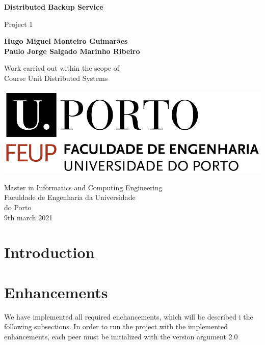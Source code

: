 \documentclass[11pt]{article}
\begin{document}
\begin{titlepage}
	\begin{center}
		\vspace*{1cm}
		
		\Large
		\textbf{Distributed Backup Service}
		
		\vspace{0.5cm}
		\large
		Project 1 
		
		\vspace{1.5cm}
		
		\textbf{Hugo Miguel Monteiro Guimarães}\\
		\textbf{Paulo Jorge Salgado Marinho Ribeiro}
		
		\vspace{4cm}
		
		Work carried out within the scope of \\
		Course Unit Distributed Systems
		
		\vspace{0.8cm}
		
		\includegraphics[width=0.4 \textwidth]{feup_logo.png}
		
		\vspace{1.5cm}		
		
		\large
		Master in Informatics and Computing Engineering\\
		Faculdade de Engenharia da Universidade\\
		do Porto\\
		9th march 2021
	
	\end{center}
\end{titlepage}


\pagebreak
\tableofcontents

\pagebreak

\section*{Introduction}


\section{Enhancements}

We have implemented all required enchancements, which will be described i the following subsections. In order to run the project with the implemented enhancements, each peer must be initialized with the version argument 2.0
\end{document}
